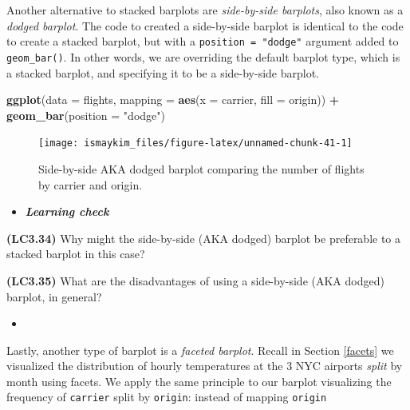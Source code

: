 \documentclass[12pt, krantz2,]{krantz}
\makeatletter
\newenvironment{Shaded}{\begin{snugshade}}{\end{snugshade}}
\newcommand{\DataTypeTok}[1]{\textcolor[rgb]{0.27,0.27,0.27}{#1}}
\newcommand{\KeywordTok}[1]{\textcolor[rgb]{0.27,0.27,0.27}{\textbf{#1}}}
\newcommand{\NormalTok}[1]{#1}
\newcommand{\OperatorTok}[1]{\textcolor[rgb]{0.43,0.43,0.43}{\textbf{#1}}}
\newcommand{\StringTok}[1]{\textcolor[rgb]{0.5,0.5,0.5}{#1}}
\newenvironment{kframe}{%
\medskip{}
\setlength{\fboxsep}{.8em}
 \def\at@end@of@kframe{}%
 \ifinner\ifhmode%
  \def\at@end@of@kframe{\end{minipage}}%
  \begin{minipage}{\columnwidth}%
 \fi\fi%
 \def\FrameCommand##1{\hskip\@totalleftmargin \hskip-\fboxsep
 \colorbox{shadecolor}{##1}\hskip-\fboxsep
     \hskip-\linewidth \hskip-\@totalleftmargin \hskip\columnwidth}%
 \MakeFramed {\advance\hsize-\width
   \@totalleftmargin\z@ \linewidth\hsize
   \@setminipage}}%
 {\par\unskip\endMakeFramed%
 \at@end@of@kframe}
\renewenvironment{Shaded}{\begin{kframe}}{\end{kframe}}
\newenvironment{rmdblock}[1]
  {\begin{shaded*}
  \begin{itemize}
  \renewcommand{\labelitemi}{
    \raisebox{-.7\height}[0pt][0pt]{
    }
  }
  \item
  }
  {
  \end{itemize}
  \end{shaded*}
  }
\newenvironment{learncheck}
  {\begin{rmdblock}{warning}}
  {\end{rmdblock}}
\makeatother
\begin{document}
Another alternative to stacked barplots are \emph{side-by-side barplots}, also known as a \emph{dodged barplot}. The code to created a side-by-side barplot is identical to the code to create a stacked barplot, but with a \texttt{position\ =\ "dodge"} argument added to \texttt{geom\_bar()}. In other words, we are overriding the default barplot type, which is a stacked barplot, and specifying it to be a side-by-side barplot.

\begin{Shaded}
\begin{Highlighting}[]
\KeywordTok{ggplot}\NormalTok{(}\DataTypeTok{data =}\NormalTok{ flights, }\DataTypeTok{mapping =} \KeywordTok{aes}\NormalTok{(}\DataTypeTok{x =}\NormalTok{ carrier, }\DataTypeTok{fill =}\NormalTok{ origin)) }\OperatorTok{+}
\StringTok{  }\KeywordTok{geom_bar}\NormalTok{(}\DataTypeTok{position =} \StringTok{"dodge"}\NormalTok{)}
\end{Highlighting}
\end{Shaded}

\begin{figure}

{\centering \texttt{[image: ismaykim\_files/figure-latex/unnamed-chunk-41-1]} 

}

\caption{Side-by-side AKA dodged barplot comparing the number of flights by carrier and origin.}\label{fig:unnamed-chunk-41}
\end{figure}

\begin{learncheck}
\textbf{\emph{Learning check}}
\end{learncheck}

\textbf{(LC3.34)} Why might the side-by-side (AKA dodged) barplot be preferable to a stacked barplot in this case?

\textbf{(LC3.35)} What are the disadvantages of using a side-by-side (AKA dodged) barplot, in general?

\begin{learncheck}

\end{learncheck}

Lastly, another type of barplot is a \emph{faceted barplot}. Recall in Section \ref{facets} we visualized the distribution of hourly temperatures at the 3 NYC airports \emph{split} by month using facets. We apply the same principle to our barplot visualizing the frequency of \texttt{carrier} split by \texttt{origin}: instead of mapping \texttt{origin}
\end{document}
